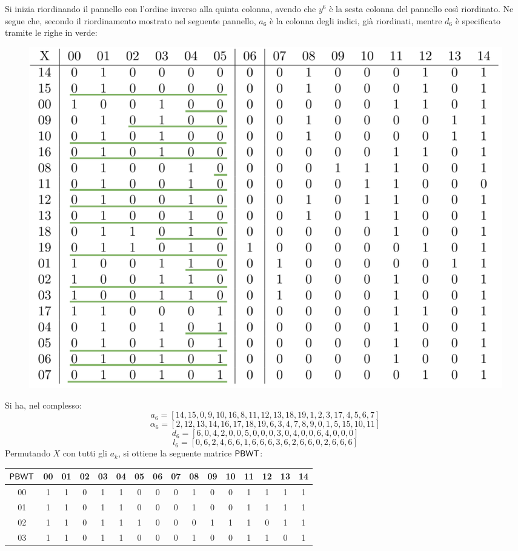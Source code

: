 \begin{esempio}
\begin{table}[H]
\begin{tabular}{c|ccccccccccccccc}
    \end{tabular}
  \end{table}
  Si inizia riordinando il pannello con l'ordine inverso alla
  quinta colonna, avendo che $y^6$ è la sesta colonna del pannello
  così riordinato. Ne segue che, secondo il riordinamento mostrato nel seguente
  pannello, $a_6$ è la 
  colonna degli indici, già riordinati, mentre $d_6$ è specificato
  tramite le righe in verde:   
  \begin{figure}[H]
    \centering
    \includegraphics[scale = 0.325]{img/matrix1.pdf}
  \end{figure}
  \noindent
  Si ha, nel complesso:
  \[a_6=[14,15,0,9,10,16,8,11,12,13,18,19,1,2,3,17,4,5,6,7]\]
  \[\alpha_6=[2,12,13,14,16,17,18,19,6,3,4,7,8,9,0,1,5,15,10,11]\]
  \[d_6=[6,0,4,2,0,0,5,0,0,0,3,0,4,0,0,6,4,0,0,0]\]
  \[l_6=[0,6,2,4,6,6,1,6,6,6,3,6,2,6,6,0,2,6,6,6]\]
  Permutando $X$ con tutti gli $a_k$, si ottiene la seguente matrice $\mbox{\rm {\sf PBWT}}$:
  \begin{table}[H]
  \centering
  \scriptsize
  \begin{tabular}{c|ccccccccccccccc}
    \tiny{$\mbox{\rm {\sf PBWT}}$} & 00 & 01 & 02 & 03 & 04 & 05 & 06 & 07 & 08 & 09 & 10 & 11 & 12 & 13
    & 14 \\
    \hline
    00 & 1 & 1 & 0 & 1 & 1 & 0 & 0 & 0 & 1 & 0 & 0 & 1 & 1 & 1 & 1 \\
    01 & 1 & 1 & 0 & 1 & 1 & 0 & 0 & 0 & 1 & 0 & 0 & 1 & 1 & 1 & 1 \\
    02 & 1 & 1 & 0 & 1 & 1 & 1 & 0 & 0 & 0 & 1 & 1 & 1 & 0 & 1 & 1 \\
    03 & 1 & 1 & 0 & 1 & 1 & 0 & 0 & 0 & 1 & 0 & 0 & 1 & 1 & 0 & 1 \\

\end{tabular}
\end{table}
\end{esempio}
